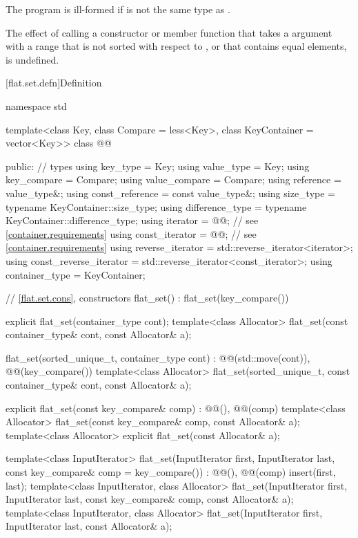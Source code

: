\pnum
The program is ill-formed if  is not the same type
as .

\pnum
The effect of calling a constructor or member function
that takes a  argument
with a range that is not sorted with respect to , or
that contains equal elements, is undefined.

[flat.set.defn]{Definition}

\begin{codeblock}
namespace std {
  template<class Key, class Compare = less<Key>, class KeyContainer = vector<Key>>
  class @@ {
  public:
    // types
    using key_type                  = Key;
    using value_type                = Key;
    using key_compare               = Compare;
    using value_compare             = Compare;
    using reference                 = value_type&;
    using const_reference           = const value_type&;
    using size_type                 = typename KeyContainer::size_type;
    using difference_type           = typename KeyContainer::difference_type;
    using iterator                  = @@;  // see \ref{container.requirements}
    using const_iterator            = @@;  // see \ref{container.requirements}
    using reverse_iterator          = std::reverse_iterator<iterator>;
    using const_reverse_iterator    = std::reverse_iterator<const_iterator>;
    using container_type            = KeyContainer;

    // \ref{flat.set.cons}, constructors
    flat_set() : flat_set(key_compare()) { }

    explicit flat_set(container_type cont);
    template<class Allocator>
      flat_set(const container_type& cont, const Allocator& a);

    flat_set(sorted_unique_t, container_type cont)
      : @@(std::move(cont)), @@(key_compare()) { }
    template<class Allocator>
      flat_set(sorted_unique_t, const container_type& cont, const Allocator& a);

    explicit flat_set(const key_compare& comp)
      : @@(), @@(comp) { }
    template<class Allocator>
      flat_set(const key_compare& comp, const Allocator& a);
    template<class Allocator>
      explicit flat_set(const Allocator& a);

    template<class InputIterator>
      flat_set(InputIterator first, InputIterator last, const key_compare& comp = key_compare())
        : @@(), @@(comp)
        { insert(first, last); }
    template<class InputIterator, class Allocator>
      flat_set(InputIterator first, InputIterator last,
               const key_compare& comp, const Allocator& a);
    template<class InputIterator, class Allocator>
      flat_set(InputIterator first, InputIterator last, const Allocator& a);

}}
\end{codeblock}
